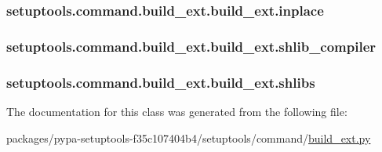\subsubsection[{inplace}]{\setlength{\rightskip}{0pt plus 5cm}setuptools.\+command.\+build\+\_\+ext.\+build\+\_\+ext.\+inplace}\label{classsetuptools_1_1command_1_1build__ext_1_1build__ext_aee4011126bb01161fccc5c02936cf97e}
\hypertarget{classsetuptools_1_1command_1_1build__ext_1_1build__ext_a1c1a12eddf646ce19ed053e946a20450}{}
\subsubsection[{shlib\+\_\+compiler}]{\setlength{\rightskip}{0pt plus 5cm}setuptools.\+command.\+build\+\_\+ext.\+build\+\_\+ext.\+shlib\+\_\+compiler}\label{classsetuptools_1_1command_1_1build__ext_1_1build__ext_a1c1a12eddf646ce19ed053e946a20450}
\hypertarget{classsetuptools_1_1command_1_1build__ext_1_1build__ext_a98d935b613d02705241d265c4cb88848}{}
\subsubsection[{shlibs}]{\setlength{\rightskip}{0pt plus 5cm}setuptools.\+command.\+build\+\_\+ext.\+build\+\_\+ext.\+shlibs}\label{classsetuptools_1_1command_1_1build__ext_1_1build__ext_a98d935b613d02705241d265c4cb88848}


The documentation for this class was generated from the following file\+:\begin{DoxyCompactItemize}
\item 
packages/pypa-\/setuptools-\/f35c107404b4/setuptools/command/\hyperlink{build__ext_8py}{build\+\_\+ext.\+py}\end{DoxyCompactItemize}

